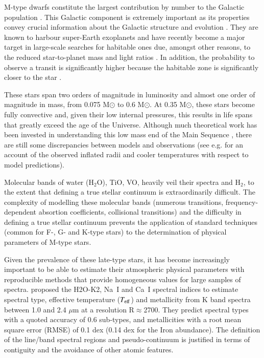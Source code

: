 
M-type dwarfs constitute the largest contribution by number to the
Galactic population \citep{2010AJ....139.2679B}. This Galactic
component is extremely important as its properties convey crucial
information about the Galactic structure and
evolution \citep{2013A&A...556A.110B}. They are known to harbour
super-Earth exoplanets \citep{2013A&A...556A.110B} and have recently
become a major target in large-scale searches for habitable ones due,
amongst other reasons, to the reduced star-to-planet mass and light
ratios \cite{2015A&A...577A.128A}. In addition, the probability to observe a
transit is significantly higher because the habitable zone is
significantly closer to the star \citep{Shields20161}.

These stars span two orders of magnitude in luminosity and almost one
order of magnitude in mass, from 0.075 M$\odot$ to 0.6 M$\odot$. At
0.35 M$\odot$, these stars become fully convective and, given their
low internal pressures, this results in life spans that greatly exceed
the age of the Universe. Although much theoretical work has been
invested in understanding this low mass end of the Main
Sequence \citep{2008ApJ...676.1262B}, there are still some
discrepancies between models and observations (see
e.g. \cite{2013AN....334....4T} for an account of the observed
inflated radii and cooler temperatures with respect to model
predictions).

Molecular bands of water (H$_2$O), TiO, VO,
heavily veil their spectra and H$_2$, to the extent that defining a true stellar
continuum is extraordinarily difficult. The complexity of modelling
these molecular bands (numerous transitions, frequency-dependent
absortion coefficients, collisional transitions) and the difficulty in
defining a true stellar continuum prevents the application of standard
techniques (common for F-, G- and K-type stars) to the determination
of physical parameters of M-type stars.

Given the prevalence of these late-type stars, it has become
increasingly important to be able to estimate their atmospheric
physical parameters with reproducible methods that provide homogeneous
values for large samples of spectra. \cite{2012ApJ...748...93R}
proposed the H2O-K2, Na~{\sc I} and Ca~{\sc I} spectral indices to
estimate spectral type, effective temperature ($T_{\rm eff}$) and
metallicity from K band spectra between 1.0 and 2.4 $\mu$m at a
resolution R$\approx$2700. They predict spectral types with a quoted
accuracy of 0.6 sub-types, and metallicities with a root mean square
error (RMSE) of 0.1 dex (0.14 dex for the Iron abundance). The
definition of the line/band spectral regions and pseudo-continuum is
justified in terms of contiguity and the avoidance of other atomic
features. 

